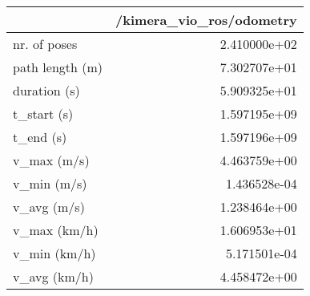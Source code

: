 \begin{tabular}{lr}
\toprule
{} &  /kimera\_vio\_ros/odometry \\
\midrule
nr. of poses    &              2.410000e+02 \\
path length (m) &              7.302707e+01 \\
duration (s)    &              5.909325e+01 \\
t\_start (s)     &              1.597195e+09 \\
t\_end (s)       &              1.597196e+09 \\
v\_max (m/s)     &              4.463759e+00 \\
v\_min (m/s)     &              1.436528e-04 \\
v\_avg (m/s)     &              1.238464e+00 \\
v\_max (km/h)    &              1.606953e+01 \\
v\_min (km/h)    &              5.171501e-04 \\
v\_avg (km/h)    &              4.458472e+00 \\
\bottomrule
\end{tabular}
